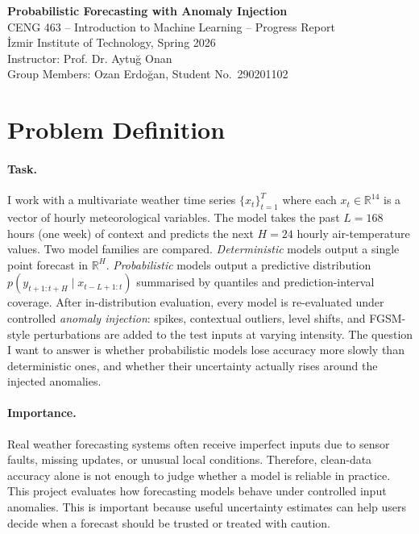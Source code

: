 \documentclass[11pt,a4paper]{article}
\begin{document}
\begin{center}
{\Large\bfseries Probabilistic Forecasting with Anomaly Injection}\\[2pt]
{\large CENG 463 -- Introduction to Machine Learning -- Progress Report}\\[2pt]
\.{I}zmir Institute of Technology, Spring 2026\\[2pt]
Instructor: Prof. Dr. Aytu\u{g} Onan\\[2pt]
Group Members: Ozan Erdo\u{g}an, Student No.\ 290201102
\end{center}

\section{Problem Definition}

\paragraph{Task.}
I work with a multivariate weather time series
$\{x_{t}\}_{t=1}^{T}$ where each $x_t \in \mathbb{R}^{14}$ is a vector of
hourly meteorological variables. The model takes the past $L=168$ hours
(one week) of context and predicts the next $H=24$ hourly air-temperature
values. Two model families are compared. \emph{Deterministic} models
output a single point forecast in $\mathbb{R}^{H}$. \emph{Probabilistic}
models output a predictive distribution
$p(y_{t+1:t+H} \mid x_{t-L+1:t})$ summarised by quantiles and
prediction-interval coverage. After in-distribution evaluation, every
model is re-evaluated under controlled \emph{anomaly injection}: spikes,
contextual outliers, level shifts, and FGSM-style perturbations are
added to the test inputs at varying intensity. The question I want to
answer is whether probabilistic models lose accuracy more slowly than
deterministic ones, and whether their uncertainty actually rises around
the injected anomalies.

\paragraph{Importance.}
Real weather forecasting systems often receive imperfect inputs due to sensor faults, missing updates, or unusual local conditions. Therefore, clean-data accuracy alone is not enough to judge whether a model is reliable in practice. This project evaluates how forecasting models behave under controlled input anomalies. This is important because useful uncertainty estimates can help users decide when a forecast should be trusted or treated with caution.
\end{document}

